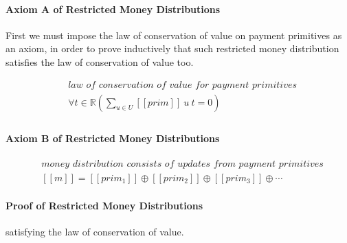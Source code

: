 \paragraph{Axiom A of Restricted Money Distributions}

First we must impose the law of conservation of value on payment primitives as an axiom, in order to
prove inductively that such restricted money distribution satisfies the law of conservation of value
too.

\begin{equation}
    \begin{split}
        &\textit{law of conservation of value for payment primitives} \\
        &\forall t \in \mathbb{R} ({\displaystyle \sum_{u \in U} [\![prim]\!]\ u\ t = 0}) \\
    \end{split}
\end{equation}

\paragraph{Axiom B of Restricted Money Distributions}

\begin{equation}
    \begin{split}
        &\textit{money distribution consists of updates from payment primitives} \\
        &[\![m]\!] = [\![prim_1]\!] \oplus [\![prim_2]\!] \oplus [\![prim_3]\!] \oplus \dotsb
    \end{split}
\end{equation}

\paragraph{Proof of Restricted Money Distributions}

satisfying the law of conservation of value.

